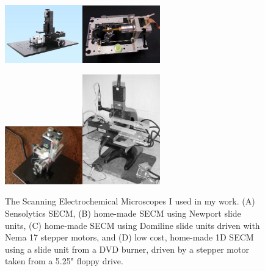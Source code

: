 \begin{figure}
\centering
\includegraphics[width=0.3\textwidth]{img/sensolytics.jpg}\includegraphics[width=0.3\textwidth]{img/diy_secm.jpg}

\includegraphics[width=0.3\textwidth]{img/agricom.jpg}\includegraphics[width=0.3\textwidth]{img/newport.eps}
\caption[The Scanning Electrochemical Microscopes I used in my work.]{The Scanning Electrochemical Microscopes I used in my work.
(A) Sensolytics SECM, (B) home-made SECM using Newport slide units, (C) home-made SECM using Domiline slide units driven with Nema 17 stepper motors, and (D) low cost, home-made 1D SECM using a slide unit from a DVD burner, driven by a stepper motor taken from a 5.25" floppy drive.}
\label{fig:secms}
\end{figure}

